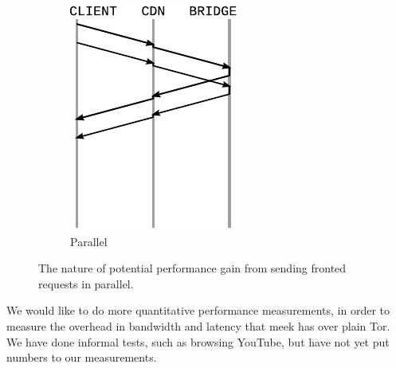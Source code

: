 \documentclass[conference]{IEEEtran}
\begin{document}
\begin{figure}
\begin{subfigure}[t]{0.40\linewidth}
\includegraphics[width=\linewidth]{wire-parallel}
\caption{Parallel}
\label{fig:wire-parallel}
\end{subfigure}

\caption{
The nature of potential performance gain
from sending fronted requests in parallel.
}
\label{fig:wire}
\end{figure}

We would like to do more quantitative performance measurements,
in order to measure the overhead in bandwidth and latency that meek has over plain Tor.
We have done informal tests, such as browsing YouTube,
but have not yet put numbers to our measurements.


\end{document}
